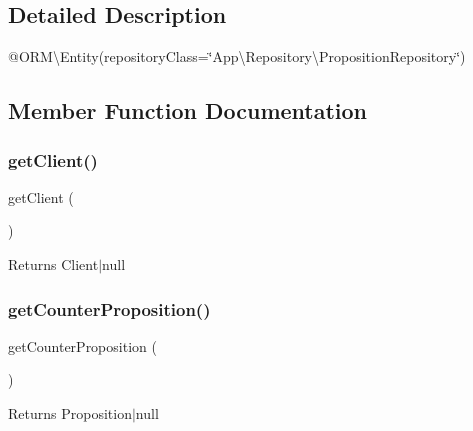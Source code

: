 \subsection{Detailed Description}
@\+O\+RM\textbackslash{}\+Entity(repository\+Class=\char`\"{}\+App\textbackslash{}\+Repository\textbackslash{}\+Proposition\+Repository\char`\"{}) 

\subsection{Member Function Documentation}
\mbox{\label{class_app_1_1_entity_1_1_proposition_a2f5f44fdf5404c87cc3a7b5719d85306}} 
\subsubsection{\texorpdfstring{getClient()}{getClient()}}
{\footnotesize\ttfamily get\+Client (\begin{DoxyParamCaption}{ }\end{DoxyParamCaption})}

\begin{DoxyReturn}{Returns}
Client$\vert$null 
\end{DoxyReturn}
\mbox{\label{class_app_1_1_entity_1_1_proposition_ac2a3d42d799371279b3f795bf4c6ae3a}} 
\subsubsection{\texorpdfstring{getCounterProposition()}{getCounterProposition()}}
{\footnotesize\ttfamily get\+Counter\+Proposition (\begin{DoxyParamCaption}{ }\end{DoxyParamCaption})}

\begin{DoxyReturn}{Returns}
Proposition$\vert$null 
\end{DoxyReturn}
\mbox{\label{class_app_1_1_entity_1_1_proposition_a24d89b0ad05ea2e33626b1fc8ed59bc3}} 
